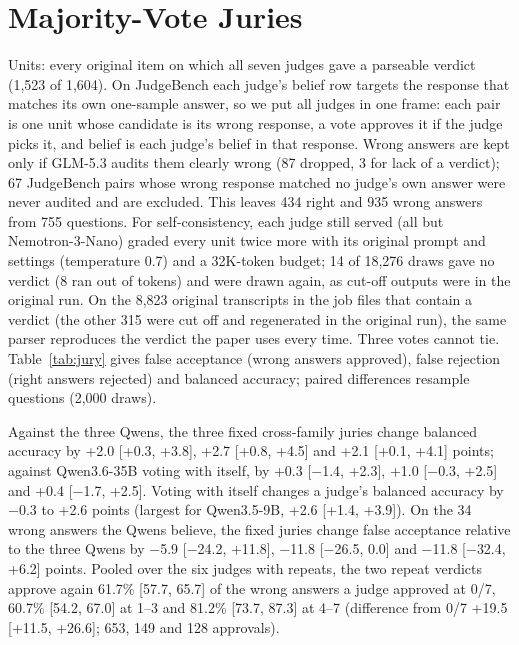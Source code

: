 \documentclass[11pt]{article}
\begin{document}
\section{Majority-Vote Juries}
\label{app:jury}

Units: every original item on which all seven judges gave a parseable verdict (1,523 of 1,604). On JudgeBench each
judge's belief row targets the response that matches its own one-sample answer, so we put all judges in one frame:
each pair is one unit whose candidate is its wrong response, a vote approves it if the judge picks it, and belief is
each judge's belief in that response. Wrong answers are kept only if GLM-5.3 audits them clearly wrong (87 dropped, 3 for lack of a verdict);
67 JudgeBench pairs whose wrong response matched no judge's own answer were never audited and are excluded. This
leaves 434 right and 935 wrong answers from 755 questions. For self-consistency, each judge still served (all but
Nemotron-3-Nano) graded every unit twice more with its original prompt and settings (temperature 0.7) and a
32K-token budget; 14 of 18,276 draws gave no verdict (8 ran out of tokens) and were drawn again, as cut-off outputs
were in the original run. On the 8,823 original transcripts in the job files that contain a verdict (the other 315
were cut off and regenerated in the original run), the same parser reproduces the verdict the paper uses every time. Three votes cannot tie. Table~\ref{tab:jury} gives false acceptance (wrong answers approved), false rejection
(right answers rejected) and balanced accuracy; paired differences resample questions (2,000 draws).

Against the three Qwens, the three fixed cross-family juries change balanced accuracy by +2.0 [+0.3, +3.8], +2.7
[+0.8, +4.5] and +2.1 [+0.1, +4.1] points; against Qwen3.6-35B voting with itself, by +0.3 [$-$1.4, +2.3], +1.0
[$-$0.3, +2.5] and +0.4 [$-$1.7, +2.5]. Voting with itself changes a judge's balanced accuracy by $-$0.3 to +2.6
points (largest for Qwen3.5-9B, +2.6 [+1.4, +3.9]). On the 34 wrong answers the Qwens believe, the fixed juries change
false acceptance relative to the three Qwens by $-$5.9 [$-$24.2, +11.8], $-$11.8 [$-$26.5, 0.0] and $-$11.8
[$-$32.4, +6.2] points. Pooled over the six judges with repeats, the two repeat verdicts approve again 61.7\% [57.7,
65.7] of the wrong answers a judge approved at 0/7, 60.7\% [54.2, 67.0] at 1--3 and 81.2\% [73.7, 87.3] at 4--7
(difference from 0/7 +19.5 [+11.5, +26.6]; 653, 149 and 128 approvals).
\end{document}
